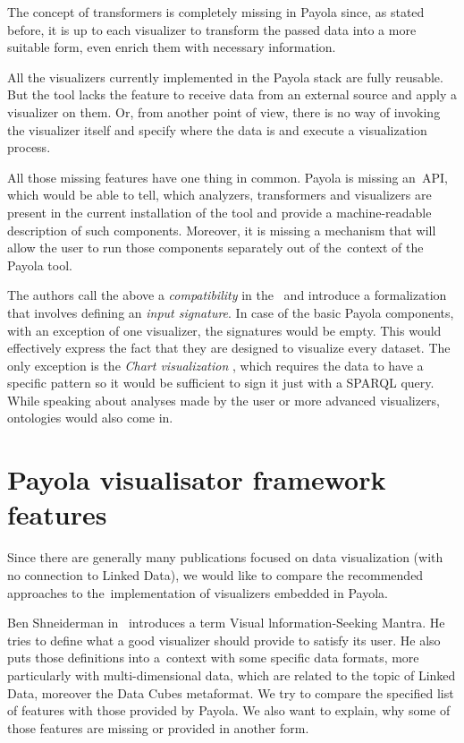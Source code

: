 The concept of transformers is completely missing in Payola since, as stated 
before, it is up to each visualizer to transform the passed data into a more 
suitable form, even enrich them with necessary information.

All the visualizers currently implemented in the Payola stack are fully 
reusable. But the tool lacks the feature to receive data from an external source 
and apply a visualizer on them. Or, from another point of view, there is no 
way of invoking the visualizer itself and specify where the data is and execute a 
visualization process.

All those missing features have one thing in common. Payola is missing 
an~API, which would be able to tell, which analyzers, transformers and 
visualizers are present in the current installation of the tool and provide a 
machine-readable description of such components. Moreover, it is missing a 
mechanism that will allow the user to run those components separately out of 
the~context of the Payola tool.

The authors call the above a \emph{compatibility} in the~\cite{ldvm2} and 
introduce a formalization that involves defining an \emph{input signature}.
In case of the basic Payola components, with an exception of one visualizer, the signatures
would be empty. This would effectively express the fact that they are designed to
visualize every dataset. The only exception is the \emph{Chart visualization },
which requires the data to have a specific pattern so it would be sufficient to sign it 
just with a SPARQL query. While speaking about analyses made by the user or more 
advanced visualizers, ontologies would also come in.

\section{Payola visualisator framework features}
Since there are generally many publications focused on data visualization (with no
connection to Linked Data), we would like to compare the recommended approaches to
the~implementation of visualizers embedded in Payola.

Ben Shneiderman in~\cite{mantra} introduces a term Visual lnformation-Seeking Mantra. He tries to define
what a good visualizer should provide to satisfy its user. He also puts those definitions into
a~context with some specific data formats, more particularly with multi-dimensional data,
which are related to the topic of Linked Data, moreover the Data Cubes metaformat. We try to
compare the specified list of features with those provided by Payola. We also want to explain,
why some of those features are missing or provided in another form.

